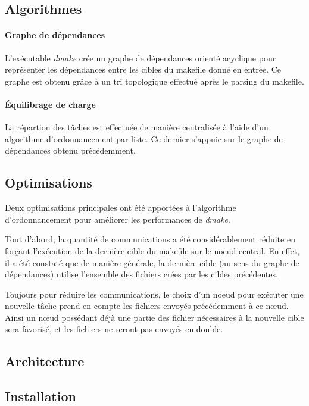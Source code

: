 \documentclass[a4paper,12pt,twoside]{article}
\begin{document}
\subsection{Algorithmes}

\paragraph{Graphe de dépendances}

L'exécutable \emph{dmake} crée un graphe de dépendances orienté
acyclique pour représenter les dépendances entre les cibles du
makefile donné en entrée. Ce graphe est obtenu grâce à un tri
topologique effectué après le parsing du makefile.

\paragraph{Équilibrage de charge}

La répartion des tâches est effectuée de manière centralisée à l'aide
d'un algorithme d'ordonnancement par liste. Ce dernier s'appuie sur le
graphe de dépendances obtenu précédemment.

\subsection{Optimisations}

Deux optimisations principales ont été apportées à l'algorithme
d'ordonnancement pour améliorer les performances de \emph{dmake}.

Tout d'abord, la quantité de communications a été considérablement
réduite en forçant l'exécution de la dernière cible du makefile sur le
noeud central. En effet, il a été constaté que de manière générale, la
dernière cible (au sens du graphe de dépendances) utilise l'ensemble
des fichiers crées par les cibles précédentes.

Toujours pour réduire les communications, le choix d'un noeud pour
exécuter une nouvelle tâche prend en compte les fichiers envoyés
précédemment à ce nœud. Ainsi un nœud possédant déjà une partie des
fichier nécessaires à la nouvelle cible sera favorisé, et les fichiers
ne seront pas envoyés en double.

\subsection{Architecture}



\subsection{Installation}
\end{document}
